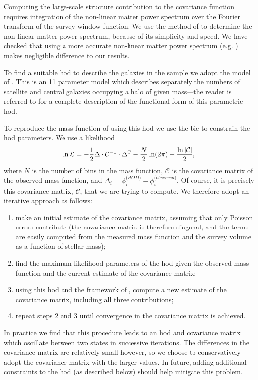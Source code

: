 Computing the large-scale structure contribution to the covariance function requires integration of the non-linear matter power spectrum over the Fourier transform of the survey window function. We use the method of \cite{peacock_non-linear_1996} to determine the non-linear matter power spectrum, because of its simplicity and speed. We have checked that using a more accurate non-linear matter power spectrum (e.g. \citealt{lawrence_coyote_2010}) makes negligible difference to our results.

To find a suitable \gls{hod} to describe the galaxies in the \cite{li_distribution_2009} sample we adopt the model of \cite{behroozi_comprehensive_2010}. This is an 11 parameter model which describes separately the numbers of satellite and central galaxies occupying a halo of given mass---the reader is referred to \cite{behroozi_comprehensive_2010} for a complete description of the functional form of this parametric \gls{hod}. 

To reproduce the mass function of \cite{li_distribution_2009} using this \gls{hod} we use the \gls{bie} \citep{weinberg_computational_2012} to constrain the \gls{hod} parameters. We use a likelihood
\begin{equation}
 \ln \mathcal{L} = -{1\over 2} \Delta\cdot \mathcal{C}^{-1}\cdot \Delta^{\mathrm T} - {N \over 2} \ln(2\pi) - {\ln |\mathcal{C}| \over 2},
\end{equation}
where $N$ is the number of bins in the mass function, $\mathcal{C}$ is the covariance matrix of the observed mass function, and $\Delta_i = \phi_i^{\mathrm (HOD)} - \phi_i^{\mathrm (observed)}$. Of course, it is precisely this covariance matrix, $\mathcal{C}$, that we are trying to compute. We therefore adopt an iterative approach as follows:
\begin{enumerate}
 \item make an initial estimate of the covariance matrix, assuming that only Poisson errors contribute (the covariance matrix is therefore diagonal, and the terms are easily computed from the measured mass function and the survey volume as a function of stellar mass);
 \item find the maximum likelihood parameters of the \gls{hod} given the observed mass function and the current estimate of the covariance matrix;
 \item using this \gls{hod} and the framework of \cite{smith_how_2012}, compute a new estimate of the covariance matrix, including all three contributions;
 \item repeat steps 2 and 3 until convergence in the covariance matrix is achieved.
\end{enumerate}
In practice we find that this procedure leads to an \gls{hod} and covariance matrix which oscillate between two states in successive iterations. The differences in the covariance matrix are relatively small however, so we choose to conservatively adopt the covariance matrix with the larger values. In future, adding additional constraints to the \gls{hod} (as described below) should help mitigate this problem.

